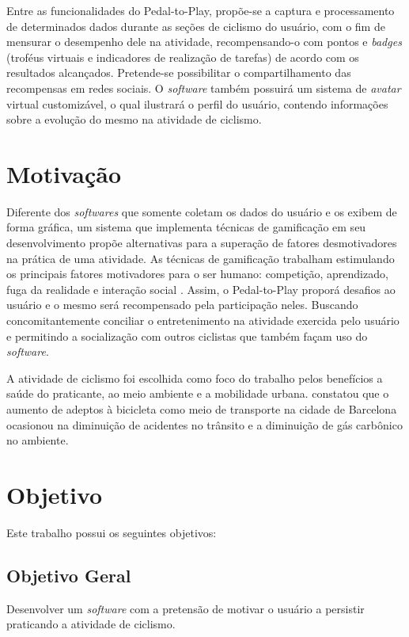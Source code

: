 Entre as funcionalidades do Pedal-to-Play, propõe-se a captura e processamento de determinados dados durante as seções de ciclismo do usuário, com o fim de mensurar o desempenho dele na atividade, recompensando-o com pontos e \textit{badges} (troféus virtuais e indicadores de realização de tarefas) de acordo com os resultados alcançados. Pretende-se possibilitar o compartilhamento das recompensas em redes sociais. O \textit{software} também possuirá um sistema de \textit{avatar} virtual customizável, o qual ilustrará o perfil do usuário, contendo informações sobre a evolução do mesmo na atividade de ciclismo.

\section{Motivação}
Diferente dos \textit{softwares} que somente coletam os dados do usuário e os exibem de forma gráfica, um sistema que implementa técnicas de gamificação em seu desenvolvimento propõe alternativas para a superação de fatores desmotivadores na prática de uma atividade. As técnicas de gamificação  trabalham estimulando os principais fatores motivadores para o ser humano: competição, aprendizado, fuga da realidade e interação social \cite{vianna2013}. Assim, o Pedal-to-Play proporá desafios ao usuário e o mesmo será recompensado pela participação neles. Buscando concomitantemente conciliar o entretenimento na atividade exercida pelo usuário e permitindo a socialização com outros ciclistas que também façam uso do \textit{software}. \par

A atividade de ciclismo foi escolhida como foco do trabalho pelos benefícios a saúde do praticante, ao meio ambiente e a mobilidade urbana. \citet{rojasrueda2011} constatou que o aumento de adeptos à bicicleta como meio de transporte na cidade de Barcelona ocasionou na diminuição de acidentes no trânsito e a diminuição de gás carbônico no ambiente.

\section{Objetivo}
Este trabalho possui os seguintes objetivos:

\subsection{Objetivo Geral}
Desenvolver um \textit{software} com a pretensão de motivar o usuário a persistir praticando a atividade de ciclismo. 

